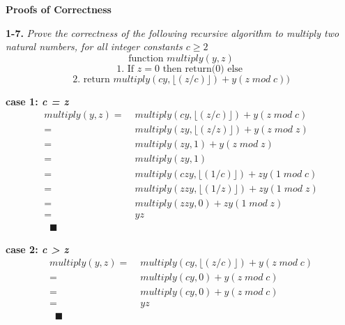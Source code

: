 \textbf{Proofs of Correctness}

\textbf{1-7.} \emph{Prove the correctness of the following recursive algorithm to multiply two
natural numbers, for all integer constants $c\geq 2$} 
   $$\text{function } multiply(y,z)$$ 
   $$\text{1. If  } z = 0 \text{ then return(0) else }$$ 
   $$\text{2. return } multiply(cy, \lfloor(z/c)\rfloor) + y(z \;mod\; c))$$

\begin{minipage}{0.95\textwidth}

\textbf{case 1: \emph{c = z}}
\begin{align*}
multiply(y,z) =& \;multiply(cy, \lfloor(z/c)\rfloor) + y(z \;mod\; c) \\
			  =& \;multiply(zy, \lfloor(z/z)\rfloor) + y(z \;mod\; z) \\
			  =& \;multiply(zy, 1) + y(z\; mod\; z) \\
			  =& \;multiply(zy, 1) \\ 
			  =& \;multiply(czy, \lfloor(1/c)\rfloor) + zy(1 \;mod\; c) \\ 
			  =& \;multiply(zzy, \lfloor(1/z)\rfloor) + zy(1 \;mod\; z) \\ 
			  =& \;multiply(zzy, 0) + zy(1 \;mod\; z) \\ 
			  =& \;yz \\
			  \;\; \blacksquare
\end{align*}
\end{minipage}

\begin{minipage}{0.95\textwidth}
\textbf{case 2: \emph{c > z}}
\begin{align*}
multiply(y,z) =& \;multiply(cy, \lfloor(z/c)\rfloor) + y(z \;mod\; c) \\
			  =& \;multiply(cy, 0) + y(z \;mod\; c) \\
			  =& \;multiply(cy, 0) + y(z \;mod\; c) \\
			  =& \;yz \\
		      \;\; \blacksquare
\end{align*}
\end{minipage}

